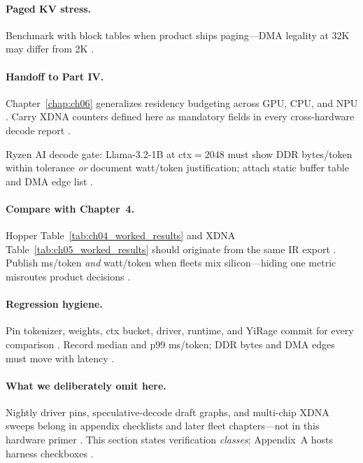 \paragraph{Paged KV stress.}
Benchmark with block tables when product ships paging---DMA legality at 32K may differ from 2K \citep{kwon2023vllm,dao2023flashdecoding,amd2024xdna}.

\paragraph{Handoff to Part IV.}
Chapter~\ref{chap:ch06} generalizes residency budgeting across GPU, CPU, and NPU \citep{yirage2026,chen2020compilerbasedhardw}.
Carry XDNA counters defined here as mandatory fields in every cross-hardware decode report \citep{amd2024xdna,amd2024aie,memoryfloor2026,taxbreak2026,patel2025llminference}.

\begin{example}
Ryzen AI decode gate: Llama-3.2-1B at ctx${=}2048$ must show DDR bytes/token within tolerance \emph{or} document watt/token justification; attach static buffer table and DMA edge list \citep{amd2024xdna,yirage2026,memoryfloor2026,taxbreak2026,patel2025llminference}.
\end{example}

\paragraph{Compare with Chapter~4.}
Hopper Table~\ref{tab:ch04_worked_results} and XDNA Table~\ref{tab:ch05_worked_results} should originate from the same IR export \citep{yirage2026,chen2020compilerbasedhardw,memoryfloor2026,taxbreak2026}.
Publish ms/token \emph{and} watt/token when fleets mix silicon---hiding one metric misroutes product decisions \citep{patel2025llminference,amd2024xdna,amd2024aie,nvidia2022hopper}.

\paragraph{Regression hygiene.}
Pin tokenizer, weights, ctx bucket, driver, runtime, and YiRage commit for every comparison \citep{taxbreak2026,memoryfloor2026,yirage2026,amd2024xdna}.
Record median and p99 ms/token; DDR bytes and DMA edges must move with latency \citep{patel2025llminference,kwon2023vllm,amd2024aie}.

\paragraph{What we deliberately omit here.}
Nightly driver pins, speculative-decode draft graphs, and multi-chip XDNA sweeps belong in appendix checklists and later fleet chapters---not in this hardware primer \citep{patel2025llminference,kwon2023vllm,liu2024deepseekv3,amd2024xdna}.
This section states verification \emph{classes}; Appendix~A hosts harness checkboxes \citep{yirage2026,chen2020compilerbasedhardw}.

